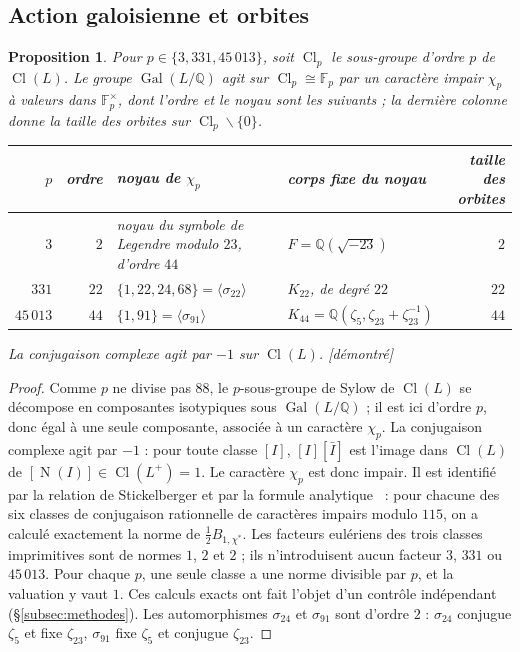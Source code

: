 \documentclass[11pt,a4paper]{amsart}
\theoremstyle{plain}
\newtheorem{proposition}[theoreme]{Proposition}
\theoremstyle{definition}
\numberwithin{equation}{section}
\newcommand{\Q}{\mathbb{Q}}
\newcommand{\F}{\mathbb{F}}
\DeclareMathOperator{\Nm}{N}
\DeclareMathOperator{\Cl}{Cl}
\DeclareMathOperator{\Gal}{Gal}
\newcommand{\st}[1]{\textup{\textsf{\small[#1]}}}
\newcommand{\DEM}{\st{démontré}}
\begin{document}
\subsection{Action galoisienne et orbites}

\begin{proposition}\label{prop:car}
Pour $p\in\{3,331,45\,013\}$, soit $\Cl_p$ le sous-groupe d'ordre $p$ de $\Cl(L)$. Le groupe $\Gal(L/\Q)$ agit sur $\Cl_p\cong\F_p$ par un caractère impair $\chi_p$ à valeurs dans $\F_p^\times$, dont l'ordre et le noyau sont les suivants ; la dernière colonne donne la taille des orbites sur $\Cl_p\smallsetminus\{0\}$.
\begin{center}\small
\begin{tabular}{rr>{\raggedright\arraybackslash}p{4.3cm}>{\raggedright\arraybackslash}p{4.2cm}r}
\toprule
$p$ & ordre & noyau de $\chi_p$ & corps fixe du noyau & taille des orbites \\
\midrule
$3$ & $2$ & noyau du symbole de Legendre modulo $23$, d'ordre $44$ & $F=\Q(\sqrt{-23})$ & $2$ \\
$331$ & $22$ & $\{1,22,24,68\}=\langle\sigma_{22}\rangle$ & $K_{22}$, de degré $22$ & $22$ \\
$45\,013$ & $44$ & $\{1,91\}=\langle\sigma_{91}\rangle$ & $K_{44}=\Q(\zeta_5,\zeta_{23}+\zeta_{23}^{-1})$ & $44$ \\
\bottomrule
\end{tabular}
\end{center}
La conjugaison complexe agit par $-1$ sur $\Cl(L)$. \DEM
\end{proposition}

\begin{proof}
Comme $p$ ne divise pas $88$, le $p$-sous-groupe de Sylow de $\Cl(L)$ se décompose en composantes isotypiques sous $\Gal(L/\Q)$ ; il est ici d'ordre $p$, donc égal à une seule composante, associée à un caractère $\chi_p$. La conjugaison complexe agit par $-1$ : pour toute classe $[I]$, $[I][\bar I]$ est l'image dans $\Cl(L)$ de $[\Nm(I)]\in\Cl(L^+)=1$. Le caractère $\chi_p$ est donc impair. Il est identifié par la relation de Stickelberger et par la formule analytique~\cite[th.~4.17 et th.~6.10]{Was97} : pour chacune des six classes de conjugaison rationnelle de caractères impairs modulo $115$, on a calculé exactement la norme de $\frac12B_{1,\chi^*}$. Les facteurs eulériens des trois classes imprimitives sont de normes $1$, $2$ et $2$ ; ils n'introduisent aucun facteur $3$, $331$ ou $45\,013$. Pour chaque $p$, une seule classe a une norme divisible par $p$, et la valuation y vaut $1$. Ces calculs exacts ont fait l'objet d'un contrôle indépendant (\S\ref{subsec:methodes}). Les automorphismes $\sigma_{24}$ et $\sigma_{91}$ sont d'ordre $2$ : $\sigma_{24}$ conjugue $\zeta_5$ et fixe $\zeta_{23}$, $\sigma_{91}$ fixe $\zeta_5$ et conjugue $\zeta_{23}$.
\end{proof}
\end{document}
